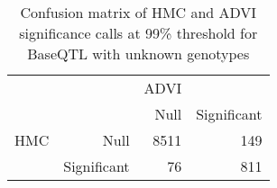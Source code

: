 \begin{table}[ht]
\centering
\caption{Confusion matrix of HMC and ADVI significance calls at 99\% threshold for BaseQTL with unknown genotypes} 
\label{tab:noGT-xtab-99}
\begin{tabular}{rr|rr}
   &  & ADVI &  \\ 
    &   & Null & Significant \\ 
   \hline
HMC & Null & 8511 & 149 \\ 
    & Significant & 76 & 811 \\ 
  \end{tabular}
\end{table}
